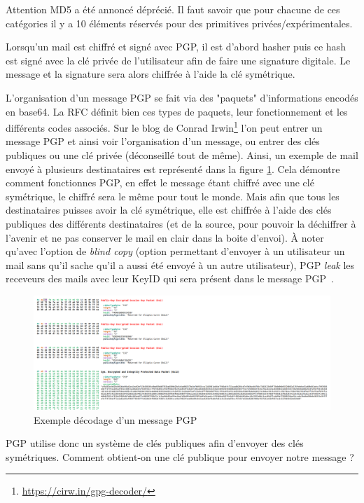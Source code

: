 Attention MD5 a été annoncé déprécié. Il faut savoir que pour chacune de ces catégories il y a 10 éléments réservés pour des primitives privées/expérimentales.

Lorsqu'un mail est chiffré et signé avec PGP, il est d'abord hasher puis ce hash est signé avec la clé privée de l'utilisateur afin de faire une signature digitale. Le message et la signature sera alors chiffrée à l'aide la clé symétrique.

L'organisation d'un message PGP se fait via des "paquets" d'informations encodés en base64. La RFC définit bien ces types de paquets, leur fonctionnement et les différents codes associés. Sur le blog de Conrad Irwin\footnote{\url{https://cirw.in/gpg-decoder/}} l'on peut entrer un message PGP et ainsi voir l'organisation d'un message, ou entrer des clés publiques ou une clé privée (déconseillé tout de même). Ainsi, un exemple de mail envoyé à plusieurs destinataires est représenté dans la figure \ref{fig:PGP_DECODE}. Cela démontre comment fonctionnes PGP, en effet le message étant chiffré avec une clé symétrique, le chiffré sera le même pour tout le monde. Mais afin que tous les destinataires puisses avoir la clé symétrique, elle est chiffrée à l'aide des clés publiques des différents destinataires (et de la source, pour pouvoir la déchiffrer à l'avenir et ne pas conserver le mail en clair dans la boite d'envoi). À noter qu'avec l'option de \textit{blind copy} (option permettant d'envoyer à un utilisateur un mail sans qu'il sache qu'il a aussi été envoyé à un autre utilisateur), PGP \textit{leak} les receveurs des mails avec leur KeyID qui sera présent dans le message PGP~\cite{BccPrivacy}.

\begin{figure}[h!]
	\includegraphics[width=14cm]{images/examplePGPDecode.png}
	\centering
	\caption{Exemple décodage d'un message PGP}
	\label{fig:PGP_DECODE}
\end{figure}

PGP utilise donc un système de clés publiques afin d'envoyer des clés symétriques. Comment obtient-on une clé publique pour envoyer notre message ?

